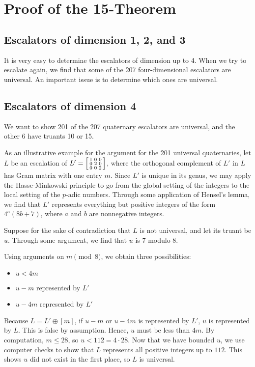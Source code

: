 \documentclass[letterpaper, 12pt]{article}
\begin{document}
\section{Proof of the 15-Theorem}
\subsection{Escalators of dimension 1, 2, and 3}
It is very easy to determine the escalators of dimension up to 4. When we try to escalate again, we find that some of the 207 four-dimensional escalators are universal. An important issue is to determine which ones are universal.

\subsection{Escalators of dimension 4}
We want to show 201 of the 207 quaternary escalators are universal, and the other 6 have truants 10 or 15.

As an illustrative example for the argument for the 201 universal quaternaries, let $L$ be an escalation of $L' = \begin{bsmallmatrix} 1 & 0 & 0 \\ 0 & 2 & 0 \\ 0 & 0 & 2 \end{bsmallmatrix}$, where the orthogonal complement of $L'$ in $L$ has Gram matrix with one entry $m$. Since $L'$ is unique in its genus, we may apply the Hasse-Minkowski principle to go from the global setting of the integers to the local setting of the $p$-adic numbers. Through some application of Hensel's lemma, we find that $L'$ represents everything but positive integers of the form $4^a (8b + 7)$, where $a$ and $b$ are nonnegative integers.

Suppose for the sake of contradiction that $L$ is not universal, and let its truant be $u$. Through some argument, we find that $u$ is $7$ modulo $8$.

Using arguments on $m \pmod 8$, we obtain three possibilities:
\begin{itemize}
    \item $u < 4m$
    \item $u - m$ represented by $L'$
    \item $u - 4m$ represented by $L'$
\end{itemize}
Because $L = L' \oplus [m]$, if $u - m$ or $u - 4m$ is represented by $L'$, $u$ is represented by $L$. This is false by assumption. Hence, $u$ must be less than $4m$. By computation, $m \le 28$, so $u < 112 = 4 \cdot 28$. Now that we have bounded $u$, we use computer checks to show that $L$ represents all positive integers up to $112$. This shows $u$ did not exist in the first place, so $L$ is universal.
\end{document}
